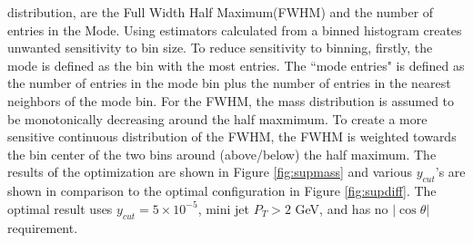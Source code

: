 distribution, are the Full Width Half Maximum(FWHM) and the number of entries in the Mode.  
Using estimators calculated from a binned histogram creates unwanted sensitivity to bin size. To reduce sensitivity to binning, firstly, the mode is defined as the bin with the most entries. The ``mode entries" is defined as the number of entries in the mode bin plus the number of entries in the nearest neighbors of the mode bin. For the FWHM, the mass distribution is assumed to be monotonically decreasing around the half maxmimum. To create a more sensitive continuous distribution of the FWHM,  the FWHM is weighted towards the bin center of the two bins around (above/below) the half maximum. The results of the optimization are shown in Figure \ref{fig:supmass} and various $y_{cut}$'s are shown in comparison to the optimal configuration in Figure \ref{fig:supdiff}. The optimal result uses $y_{cut} = 5\times 10^{-5}$, mini jet $P_T > 2$ GeV, and has no $|\cos \theta|$ requirement. 

